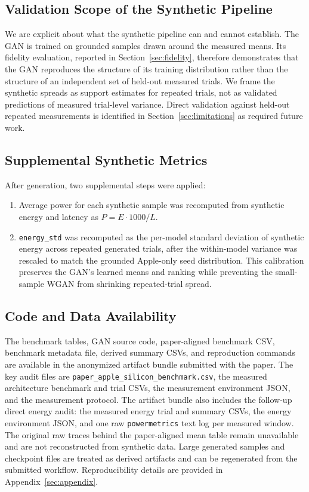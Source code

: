 \documentclass{svproc}
\begin{document}
\subsection{Validation Scope of the Synthetic Pipeline}
We are explicit about what the synthetic pipeline can and cannot establish.
The GAN is trained on grounded samples drawn around the measured means. Its
fidelity evaluation, reported in Section~\ref{sec:fidelity}, therefore
demonstrates that the GAN reproduces the structure of its training
distribution rather than the structure of an independent set of held-out
measured trials. We frame the synthetic spreads as support estimates for
repeated trials, not as validated predictions of measured trial-level
variance. Direct validation against held-out repeated measurements is
identified in Section~\ref{sec:limitations} as required future work.

\subsection{Supplemental Synthetic Metrics}
After generation, two supplemental steps were applied:
\begin{enumerate}
\item Average power for each synthetic sample was recomputed from synthetic
energy and latency as $P = E \cdot 1000 / L$.
\item \texttt{energy\_std} was recomputed as the per-model standard deviation
of synthetic energy across repeated generated trials, after the within-model
variance was rescaled to match the grounded Apple-only seed distribution. This
calibration preserves the GAN's learned means and ranking while preventing the
small-sample WGAN from shrinking repeated-trial spread.
\end{enumerate}

\subsection{Code and Data Availability}
The benchmark tables, GAN source code, paper-aligned benchmark CSV, benchmark
metadata file, derived summary CSVs, and reproduction commands are available
in the anonymized artifact bundle submitted with the paper. The key audit files are
\texttt{paper\_apple\_silicon\_benchmark.csv}, the measured architecture
benchmark and trial CSVs, the measurement environment JSON, and the measurement
protocol. The artifact bundle also includes the follow-up direct energy audit:
the measured energy trial and summary CSVs, the energy environment JSON, and
one raw \texttt{powermetrics} text log per measured window. The original raw
traces behind the paper-aligned mean table remain unavailable and are not
reconstructed from synthetic data. Large generated samples and checkpoint
files are treated as derived artifacts and can be regenerated from the
submitted workflow.
Reproducibility details are provided in Appendix~\ref{sec:appendix}.
\end{document}
